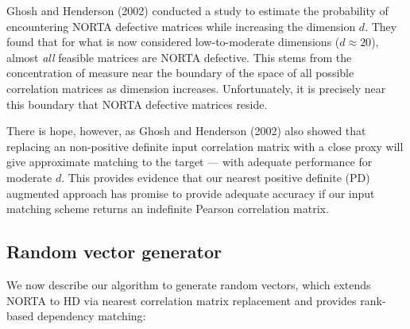 \documentclass{article}
\begin{document}
Ghosh and Henderson (2002) conducted a study to estimate the probability
of encountering NORTA defective matrices while increasing the dimension
\(d\). They found that for what is now considered low-to-moderate
dimensions (\(d \approx 20\)), almost \emph{all} feasible matrices are
NORTA defective. This stems from the concentration of measure near the
boundary of the space of all possible correlation matrices as dimension
increases. Unfortunately, it is precisely near this boundary that NORTA
defective matrices reside.

There is hope, however, as Ghosh and Henderson (2002) also showed that
replacing an non-positive definite input correlation matrix with a close
proxy will give approximate matching to the target --- with adequate
performance for moderate \(d\). This provides evidence that our nearest
positive definite (PD) augmented approach has promise to provide
adequate accuracy if our input matching scheme returns an indefinite
Pearson correlation matrix.

\hypertarget{rand-vec-gen}{%
\subsection{Random vector generator}\label{rand-vec-gen}}

We now describe our algorithm to generate random vectors, which extends
NORTA to HD via nearest correlation matrix replacement and provides
rank-based dependency matching:
\end{document}
